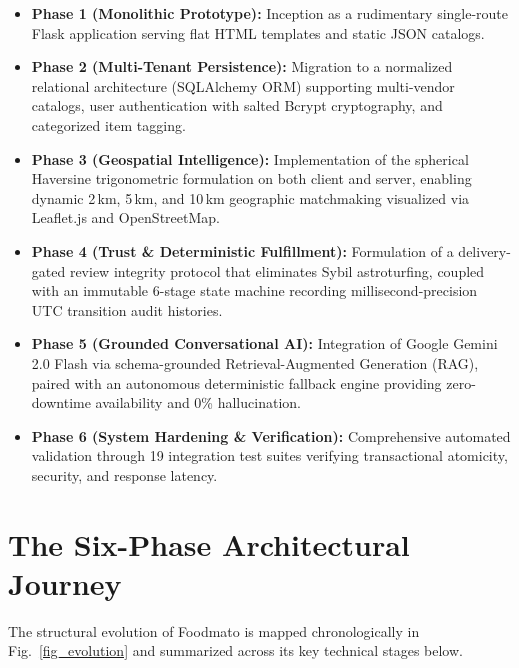\documentclass[conference]{IEEEtran}
\begin{document}
\begin{itemize}
    \item \textbf{Phase 1 (Monolithic Prototype):} Inception as a rudimentary single-route Flask application serving flat HTML templates and static JSON catalogs.
    \item \textbf{Phase 2 (Multi-Tenant Persistence):} Migration to a normalized relational architecture (SQLAlchemy ORM) supporting multi-vendor catalogs, user authentication with salted Bcrypt cryptography, and categorized item tagging.
    \item \textbf{Phase 3 (Geospatial Intelligence):} Implementation of the spherical Haversine trigonometric formulation on both client and server, enabling dynamic 2\,km, 5\,km, and 10\,km geographic matchmaking visualized via Leaflet.js and OpenStreetMap.
    \item \textbf{Phase 4 (Trust \& Deterministic Fulfillment):} Formulation of a delivery-gated review integrity protocol that eliminates Sybil astroturfing, coupled with an immutable 6-stage state machine recording millisecond-precision UTC transition audit histories.
    \item \textbf{Phase 5 (Grounded Conversational AI):} Integration of Google Gemini 2.0 Flash via schema-grounded Retrieval-Augmented Generation (RAG), paired with an autonomous deterministic fallback engine providing zero-downtime availability and 0\% hallucination.
    \item \textbf{Phase 6 (System Hardening \& Verification):} Comprehensive automated validation through 19 integration test suites verifying transactional atomicity, security, and response latency.
\end{itemize}

\section{The Six-Phase Architectural Journey}
The structural evolution of Foodmato is mapped chronologically in Fig.~\ref{fig_evolution} and summarized across its key technical stages below.
\end{document}
